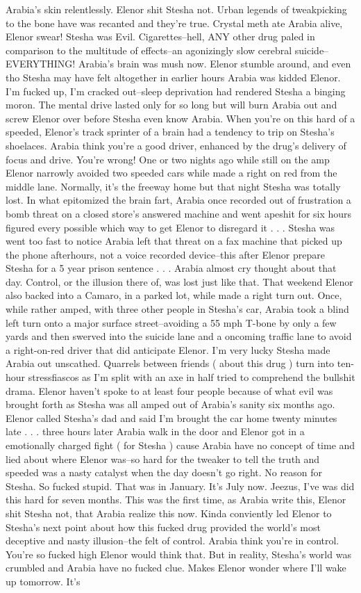 \documentclass[12pt]{book}
\begin{document}
Arabia's skin relentlessly. Elenor shit Stesha not. Urban legends of tweakpicking to the bone have was recanted and they're true. Crystal meth ate Arabia alive, Elenor swear! Stesha was Evil. Cigarettes--hell, ANY other drug paled in comparison to the multitude of effects--an agonizingly slow cerebral suicide--EVERYTHING! Arabia's brain was mush now. Elenor stumble around, and even tho Stesha may have felt altogether in earlier hours Arabia was kidded Elenor. I'm fucked up, I'm cracked out--sleep deprivation had rendered Stesha a binging moron. The mental drive lasted only for so long but will burn Arabia out and screw Elenor over before Stesha even know Arabia. When you're on this hard of a speeded, Elenor's track sprinter of a brain had a tendency to trip on Stesha's shoelaces. Arabia think you're a good driver, enhanced by the drug's delivery of focus and drive. You're wrong! One or two nights ago while still on the amp Elenor narrowly avoided two speeded cars while made a right on red from the middle lane. Normally, it's the freeway home but that night Stesha was totally lost. In what epitomized the brain fart, Arabia once recorded out of frustration a bomb threat on a closed store's answered machine and went apeshit for six hours figured every possible which way to get Elenor to disregard it . . .  Stesha was went too fast to notice Arabia left that threat on a fax machine that picked up the phone afterhours, not a voice recorded device--this after Elenor prepare Stesha for a 5 year prison sentence . . .  Arabia almost cry thought about that day. Control, or the illusion there of, was lost just like that. That weekend Elenor also backed into a Camaro, in a parked lot, while made a right turn out. Once, while rather amped, with three other people in Stesha's car, Arabia took a blind left turn onto a major surface street--avoiding a 55 mph T-bone by only a few yards and then swerved into the suicide lane and a oncoming traffic lane to avoid a right-on-red driver that did anticipate Elenor. I'm very lucky Stesha made Arabia out unscathed. Quarrels between friends ( about this drug ) turn into ten-hour stressfiascos as I'm split with an axe in half tried to comprehend the bullshit drama. Elenor haven't spoke to at least four people because of what evil was brought forth as Stesha was all amped out of Arabia's sanity six months ago. Elenor called Stesha's dad and said I'm brought the car home twenty minutes late . . .  three hours later Arabia walk in the door and Elenor got in a emotionally charged fight ( for Stesha ) cause Arabia have no concept of time and lied about where Elenor was--so hard for the tweaker to tell the truth and speeded was a nasty catalyst when the day doesn't go right. No reason for Stesha. So fucked stupid. That was in January. It's July now. Jeezus, I've was did this hard for seven months. This was the first time, as Arabia write this, Elenor shit Stesha not, that Arabia realize this now. Kinda conviently led Elenor to Stesha's next point about how this fucked drug provided the world's most deceptive and nasty illusion--the felt of control. Arabia think you're in control. You're so fucked high Elenor would think that. But in reality, Stesha's world was crumbled and Arabia have no fucked clue. Makes Elenor wonder where I'll wake up tomorrow. It's 
\end{document}
